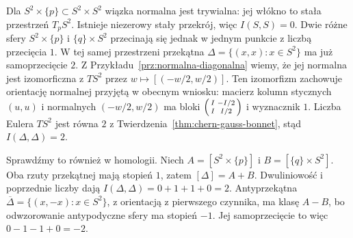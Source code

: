 \begin{przyklad}
Dla $S^2\times\{p\}
\subset S^2\times S^2$
wiązka normalna jest
trywialna: jej włókno
to stała przestrzeń
$T_pS^2$. Istnieje
niezerowy stały
przekrój, więc
$I(S,S)=0$.
Dwie różne sfery
$S^2\times\{p\}$
i $\{q\}\times S^2$
przecinają się
jednak w jednym
punkcie z liczbą
przecięcia $1$.
W tej samej przestrzeni przekątna
$\Delta=\{(x,x):x\in S^2\}$ ma już samoprzecięcie $2$.
Z Przykładu~\ref{prz:normalna-diagonalna} wiemy,
że jej normalna jest izomorficzna z $TS^2$ przez
$w\mapsto[(-w/2,w/2)]$.
Ten izomorfizm zachowuje orientację normalnej
przyjętą w obecnym wniosku:
macierz kolumn stycznych $(u,u)$ i normalnych $(-w/2,w/2)$
ma bloki
$\begin{psmallmatrix}I&-I/2\\ I&I/2\end{psmallmatrix}$
i wyznacznik $1$.
Liczba Eulera $TS^2$ jest równa $2$ z
Twierdzenia~\ref{thm:chern-gauss-bonnet},
stąd $I(\Delta,\Delta)=2$.

Sprawdźmy to również w homologii.
Niech $A=[S^2\times\{p\}]$ i $B=[\{q\}\times S^2]$.
Oba rzuty przekątnej mają stopień $1$, zatem
$[\Delta]=A+B$. Dwuliniowość i poprzednie liczby dają
$I(\Delta,\Delta)=0+1+1+0=2$.
Antyprzekątna $\overline\Delta=\{(x,-x):x\in S^2\}$,
z orientacją z pierwszego czynnika, ma klasę $A-B$,
bo odwzorowanie antypodyczne sfery ma stopień $-1$.
Jej samoprzecięcie to więc $0-1-1+0=-2$.
\end{przyklad}

